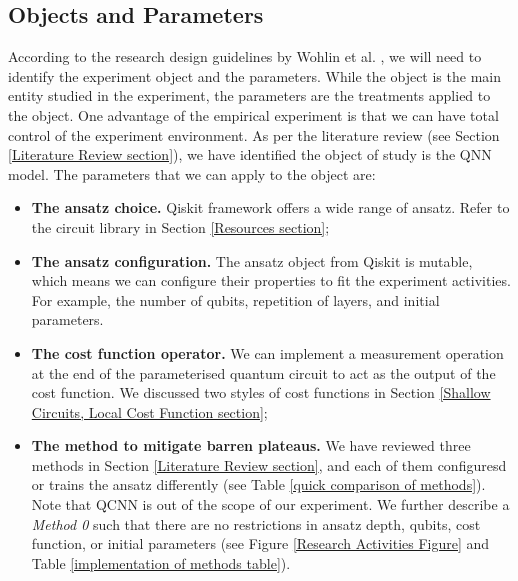 \subsection{Objects and Parameters}\label{Objects section}
According to the research design guidelines by Wohlin et al. \cite[ch 6]{wohlinExperimentationSoftwareEngineering2012}, we will need to identify the experiment object and the parameters.
While the object is the main entity studied in the experiment, the parameters are the treatments applied to the object.
One advantage of the empirical experiment is that we can have total control of the experiment environment.
As per the literature review (see Section \ref{Literature Review section}), we have identified the object of study is the QNN model.
The parameters that we can apply to the object are:
\begin{itemize}
    \item \textbf{The ansatz choice.} Qiskit framework offers a wide range of ansatz. Refer to the circuit library in Section \ref{Resources section};
    \item \textbf{The ansatz configuration.} The ansatz object from Qiskit is mutable, which means we can configure their properties to fit the experiment activities. For example, the number of qubits, repetition of layers, and initial parameters.
    \item \textbf{The cost function operator.} We can implement a measurement operation at the end of the parameterised quantum circuit to act as the output of the cost function. We discussed two styles of cost functions in Section \ref{Shallow Circuits, Local Cost Function section};
    \item \textbf{The method to mitigate barren plateaus.} We have reviewed three methods in Section \ref{Literature Review section}, and each of them configuresd or trains the ansatz differently (see Table \ref{quick comparison of methods}). Note that QCNN is out of the scope of our experiment. We further describe a \emph{Method 0} such that there are no restrictions in ansatz depth, qubits, cost function, or initial parameters (see Figure \ref{Research Activities Figure} and Table \ref{implementation of methods table}).
\end{itemize}